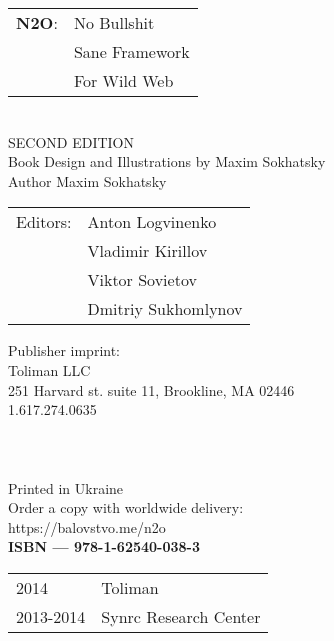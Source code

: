 \begingroup
\topskip 20pt
\parindent 0pt
\parskip
\baselineskip

\begin{tabular}{ll}
{\bf N2O}: & No Bullshit \\
    & Sane Framework \\
    & For Wild Web \\
\end{tabular}
\\

SECOND EDITION \\

Book Design and Illustrations by Maxim Sokhatsky \\
Author Maxim Sokhatsky \\

\begin{tabular}{ll}
Editors: & Anton Logvinenko \\
         & Vladimir Kirillov \\
         & Viktor Sovietov \\
         & Dmitriy Sukhomlynov \\
\end{tabular}

Publisher imprint: \\
Toliman LLC \\
251 Harvard st. suite 11, Brookline, MA 02446 \\
1.617.274.0635 \\
\\
\\
\\




Printed in Ukraine \\

Order a copy with worldwide delivery: \\
https://balovstvo.me/n2o \\

{\bf  ISBN — 978-1-62540-038-3\hspace{2em}}

\begin{tabular}{ll}
\textcopyright{} 2014 & Toliman \\
\textcopyright{} 2013-2014 & Synrc Research Center
\end{tabular}

\endgroup

   \thispagestyle{empty}
